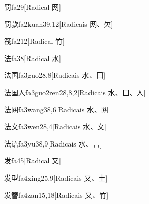 \begin{entry}{罚}{fa2}{9}[Radical ⽹]
\end{entry}

\begin{entry}{罚款}{fa2kuan3}{9,12}[Radicais ⽹、⽋]
\end{entry}

\begin{entry}{筏}{fa2}{12}[Radical ⽵]
\end{entry}

\begin{entry}{法}{fa3}{8}[Radical ⽔]
\end{entry}

\begin{entry}{法国}{fa3guo2}{8,8}[Radicais ⽔、⼞]
\end{entry}

\begin{entry}{法国人}{fa3guo2ren2}{8,8,2}[Radicais ⽔、⼞、⼈]
\end{entry}

\begin{entry}{法网}{fa3wang3}{8,6}[Radicais ⽔、⽹]
\end{entry}

\begin{entry}{法文}{fa3wen2}{8,4}[Radicais ⽔、⽂]
\end{entry}

\begin{entry}{法语}{fa3yu3}{8,9}[Radicais ⽔、⾔]
\end{entry}

\begin{entry}{发}{fa4}{5}[Radical ⼜]
\end{entry}

\begin{entry}{发型}{fa4xing2}{5,9}[Radicais ⼜、⼟]
\end{entry}

\begin{entry}{发簪}{fa4zan1}{5,18}[Radicais ⼜、⽵]
\end{entry}

